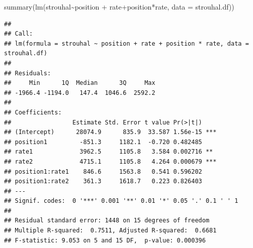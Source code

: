 \documentclass[
]{book}
\newenvironment{Shaded}{\begin{snugshade}}{\end{snugshade}}
\newcommand{\AttributeTok}[1]{\textcolor[rgb]{0.77,0.63,0.00}{#1}}
\newcommand{\FunctionTok}[1]{\textcolor[rgb]{0.00,0.00,0.00}{#1}}
\newcommand{\NormalTok}[1]{#1}
\newcommand{\SpecialCharTok}[1]{\textcolor[rgb]{0.00,0.00,0.00}{#1}}
\begin{document}
\begin{Shaded}
\begin{Highlighting}[]
\FunctionTok{summary}\NormalTok{(}\FunctionTok{lm}\NormalTok{(strouhal}\SpecialCharTok{\textasciitilde{}}\NormalTok{position }\SpecialCharTok{+}\NormalTok{ rate}\SpecialCharTok{+}\NormalTok{position}\SpecialCharTok{*}\NormalTok{rate, }\AttributeTok{data =}\NormalTok{ strouhal.df))}
\end{Highlighting}
\end{Shaded}

\begin{verbatim}
## 
## Call:
## lm(formula = strouhal ~ position + rate + position * rate, data = strouhal.df)
## 
## Residuals:
##     Min      1Q  Median      3Q     Max 
## -1966.4 -1194.0   147.4  1046.6  2592.2 
## 
## Coefficients:
##                 Estimate Std. Error t value Pr(>|t|)    
## (Intercept)      28074.9      835.9  33.587 1.56e-15 ***
## position1         -851.3     1182.1  -0.720 0.482485    
## rate1             3962.5     1105.8   3.584 0.002716 ** 
## rate2             4715.1     1105.8   4.264 0.000679 ***
## position1:rate1    846.6     1563.8   0.541 0.596202    
## position1:rate2    361.3     1618.7   0.223 0.826403    
## ---
## Signif. codes:  0 '***' 0.001 '**' 0.01 '*' 0.05 '.' 0.1 ' ' 1
## 
## Residual standard error: 1448 on 15 degrees of freedom
## Multiple R-squared:  0.7511, Adjusted R-squared:  0.6681 
## F-statistic: 9.053 on 5 and 15 DF,  p-value: 0.000396
\end{verbatim}
\end{document}
